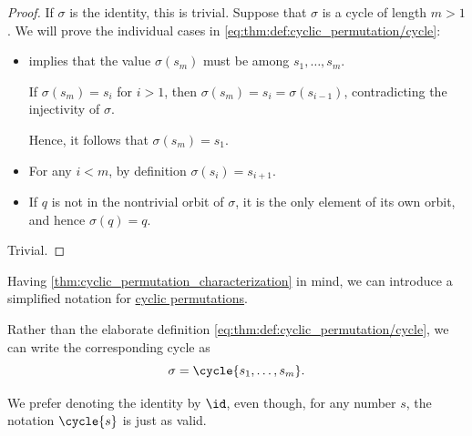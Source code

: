 \begin{proof}
   If \( \sigma \) is the identity, this is trivial. Suppose that \( \sigma \) is a cycle of length \( m > 1 \). We will prove the individual cases in \eqref{eq:thm:def:cyclic_permutation/cycle}:
  \begin{itemize}
    \item {} implies that the value \( \sigma(s_m) \) must be among \( s_1, \ldots, s_m \).

    If \( \sigma(s_m) = s_i \) for \( i > 1 \), then \( \sigma(s_m) = s_i = \sigma(s_{i-1}) \), contradicting the injectivity of \( \sigma \).

    Hence, it follows that \( \sigma(s_m) = s_1 \).

    \item For any \( i < m \), by definition \( \sigma(s_i) = s_{i + 1} \).

    \item If \( q \) is not in the nontrivial orbit of \( \sigma \), it is the only element of its own orbit, and hence \( \sigma(q) = q \).
  \end{itemize}

   Trivial.
\end{proof}

\begin{remark}\label{rem:cycle_notation}
  Having \cref{thm:cyclic_permutation_characterization} in mind, we can introduce a simplified notation for \hyperref[def:cyclic_permutation]{cyclic permutations}.

  Rather than the elaborate definition \eqref{eq:thm:def:cyclic_permutation/cycle}, we can write the corresponding cycle as
  \begin{equation*}
    \sigma = \cycle{ s_1, \ldots, s_m }.
  \end{equation*}

  We prefer denoting the identity by \( \id \), even though, for any number \( s \), the notation \( \cycle{ s } \) is just as valid.
\end{remark}

